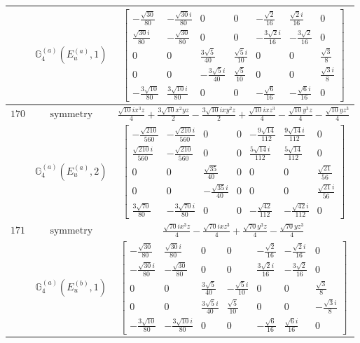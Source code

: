 \documentclass[fleqn,8pt,landscape]{jsarticle}
\begin{document}
\begin{longtable}{ccc}
$  $ & $ \mathbb{G}_{4}^{(a)}(E_{u}^{(a)},1) $ & $ \begin{bmatrix} - \frac{\sqrt{30}}{80} & - \frac{\sqrt{30} i}{80} & 0 & 0 & - \frac{\sqrt{2}}{16} & \frac{\sqrt{2} i}{16} & 0 \\ \frac{\sqrt{30} i}{80} & - \frac{\sqrt{30}}{80} & 0 & 0 & - \frac{3 \sqrt{2} i}{16} & - \frac{3 \sqrt{2}}{16} & 0 \\ 0 & 0 & \frac{3 \sqrt{5}}{40} & \frac{\sqrt{5} i}{10} & 0 & 0 & \frac{\sqrt{3}}{8} \\ 0 & 0 & - \frac{3 \sqrt{5} i}{40} & \frac{\sqrt{5}}{10} & 0 & 0 & \frac{\sqrt{3} i}{8} \\ - \frac{3 \sqrt{10}}{80} & \frac{3 \sqrt{10} i}{80} & 0 & 0 & - \frac{\sqrt{6}}{16} & - \frac{\sqrt{6} i}{16} & 0 \end{bmatrix} $ \\ \hline
$ 170 $ & $ \text{symmetry} $ & $ \frac{\sqrt{10} i x^{3} z}{4} + \frac{3 \sqrt{10} x^{2} y z}{2} - \frac{3 \sqrt{10} i x y^{2} z}{2} + \frac{\sqrt{10} i x z^{3}}{4} - \frac{\sqrt{10} y^{3} z}{4} - \frac{\sqrt{10} y z^{3}}{4} $ \\
$  $ & $ \mathbb{G}_{4}^{(a)}(E_{u}^{(a)},2) $ & $ \begin{bmatrix} - \frac{\sqrt{210}}{560} & - \frac{\sqrt{210} i}{560} & 0 & 0 & - \frac{9 \sqrt{14}}{112} & \frac{9 \sqrt{14} i}{112} & 0 \\ \frac{\sqrt{210} i}{560} & - \frac{\sqrt{210}}{560} & 0 & 0 & \frac{5 \sqrt{14} i}{112} & \frac{5 \sqrt{14}}{112} & 0 \\ 0 & 0 & \frac{\sqrt{35}}{40} & 0 & 0 & 0 & \frac{\sqrt{21}}{56} \\ 0 & 0 & - \frac{\sqrt{35} i}{40} & 0 & 0 & 0 & \frac{\sqrt{21} i}{56} \\ \frac{3 \sqrt{70}}{80} & - \frac{3 \sqrt{70} i}{80} & 0 & 0 & - \frac{\sqrt{42}}{112} & - \frac{\sqrt{42} i}{112} & 0 \end{bmatrix} $ \\ \hline
$ 171 $ & $ \text{symmetry} $ & $ \frac{\sqrt{70} i x^{3} z}{4} - \frac{\sqrt{70} i x z^{3}}{4} + \frac{\sqrt{70} y^{3} z}{4} - \frac{\sqrt{70} y z^{3}}{4} $ \\
$  $ & $ \mathbb{G}_{4}^{(a)}(E_{u}^{(b)},1) $ & $ \begin{bmatrix} - \frac{\sqrt{30}}{80} & \frac{\sqrt{30} i}{80} & 0 & 0 & - \frac{\sqrt{2}}{16} & - \frac{\sqrt{2} i}{16} & 0 \\ - \frac{\sqrt{30} i}{80} & - \frac{\sqrt{30}}{80} & 0 & 0 & \frac{3 \sqrt{2} i}{16} & - \frac{3 \sqrt{2}}{16} & 0 \\ 0 & 0 & \frac{3 \sqrt{5}}{40} & - \frac{\sqrt{5} i}{10} & 0 & 0 & \frac{\sqrt{3}}{8} \\ 0 & 0 & \frac{3 \sqrt{5} i}{40} & \frac{\sqrt{5}}{10} & 0 & 0 & - \frac{\sqrt{3} i}{8} \\ - \frac{3 \sqrt{10}}{80} & - \frac{3 \sqrt{10} i}{80} & 0 & 0 & - \frac{\sqrt{6}}{16} & \frac{\sqrt{6} i}{16} & 0 \end{bmatrix} $ \\ \hline

\end{longtable}
\end{document}
